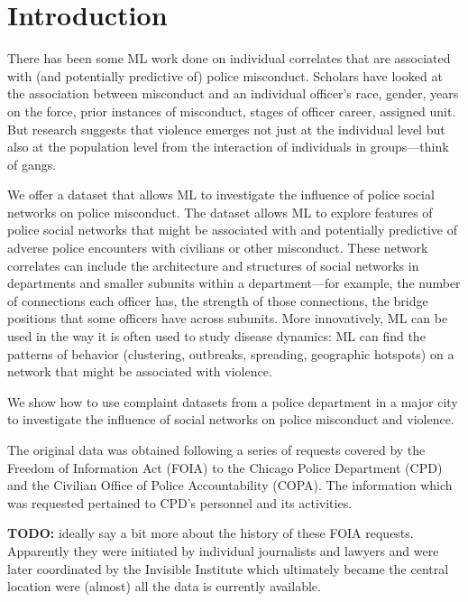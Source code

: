 \section{Introduction}

There has been some ML work done on individual correlates that are associated
with (and potentially predictive of) police misconduct. Scholars have looked at
the association between misconduct and an individual officer's race, gender,
years on the force, prior instances of misconduct, stages of officer career,
assigned unit. But research suggests that violence emerges not just at the
individual level but also at the population level from the interaction of
individuals in groups—think of gangs. 

 
We offer a dataset that allows ML to investigate the influence of police social
networks on police misconduct. The dataset allows ML to explore features of
police social networks that might be associated with and potentially predictive
of adverse police encounters with civilians or other misconduct. These network
correlates can include the architecture and structures of social networks in
departments and smaller subunits within a department—for example, the number of
connections each officer has, the strength of those connections, the bridge
positions that some officers have across subunits. More innovatively, ML can be
used in the way it is often used to study disease dynamics: ML can find the
patterns of behavior (clustering, outbreaks, spreading, geographic hotspots) on
a network that might be associated with violence. 

 
We show how to use complaint datasets from a police department in a major city
to investigate the influence of social networks on police misconduct and
violence. 


The original data was obtained following a series of requests covered by the
Freedom of Information Act (FOIA) to the Chicago Police Department (CPD) and
the Civilian Office of Police Accountability (COPA). The information which was
requested pertained to CPD's personnel and its activities.

\textbf{TODO:} ideally say a bit more about the history of these FOIA requests.
Apparently they were initiated by individual journalists and lawyers and were
later coordinated by the Invisible Institute which ultimately became the
central location were (almost) all the data is currently available.

